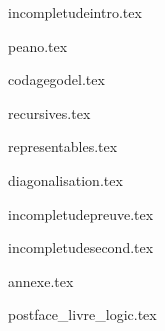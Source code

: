 \documentclass[10pt,twoside,openright]{report}
\begin{document}
{incompletudeintro.tex}

{peano.tex}

{codagegodel.tex}

{recursives.tex}

{representables.tex}

{diagonalisation.tex}

{incompletudepreuve.tex}

{incompletudesecond.tex}

	
\clearemptydoublepage

{annexe.tex}

{postface_livre_logic.tex}

\vfill

\end{document}
